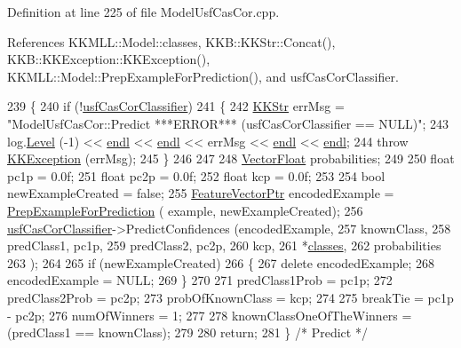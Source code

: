 Definition at line 225 of file Model\+Usf\+Cas\+Cor.\+cpp.



References K\+K\+M\+L\+L\+::\+Model\+::classes, K\+K\+B\+::\+K\+K\+Str\+::\+Concat(), K\+K\+B\+::\+K\+K\+Exception\+::\+K\+K\+Exception(), K\+K\+M\+L\+L\+::\+Model\+::\+Prep\+Example\+For\+Prediction(), and usf\+Cas\+Cor\+Classifier.


\begin{DoxyCode}
239 \{
240   \textcolor{keywordflow}{if}  (!\hyperlink{class_k_k_m_l_l_1_1_model_usf_cas_cor_a7aeb7274e64e73ccfeea3a9da6633d60}{usfCasCorClassifier})
241   \{
242     \hyperlink{class_k_k_b_1_1_k_k_str}{KKStr} errMsg = \textcolor{stringliteral}{"ModelUsfCasCor::Predict   ***ERROR***      (usfCasCorClassifier == NULL)"};
243     log.\hyperlink{class_k_k_b_1_1_run_log_a32cf761d7f2e747465fd80533fdbb659}{Level} (-1) << \hyperlink{namespace_k_k_b_ad1f50f65af6adc8fa9e6f62d007818a8}{endl} << \hyperlink{namespace_k_k_b_ad1f50f65af6adc8fa9e6f62d007818a8}{endl} << errMsg << \hyperlink{namespace_k_k_b_ad1f50f65af6adc8fa9e6f62d007818a8}{endl} << \hyperlink{namespace_k_k_b_ad1f50f65af6adc8fa9e6f62d007818a8}{endl};
244     \textcolor{keywordflow}{throw} \hyperlink{class_k_k_b_1_1_k_k_exception}{KKException} (errMsg);
245   \}
246 
247 
248   \hyperlink{namespace_k_k_b_a4820c3670ee1fe74f0c4de981c600faf}{VectorFloat}  probabilities;
249 
250   \textcolor{keywordtype}{float}  pc1p = 0.0f;
251   \textcolor{keywordtype}{float}  pc2p = 0.0f;
252   \textcolor{keywordtype}{float}  kcp = 0.0f;
253 
254   \textcolor{keywordtype}{bool}  newExampleCreated = \textcolor{keyword}{false};
255   \hyperlink{class_k_k_m_l_l_1_1_feature_vector}{FeatureVectorPtr}  encodedExample = \hyperlink{class_k_k_m_l_l_1_1_model_a31b972adfb64769b3ae966debec824fd}{PrepExampleForPrediction} (
      example, newExampleCreated);
256   \hyperlink{class_k_k_m_l_l_1_1_model_usf_cas_cor_a7aeb7274e64e73ccfeea3a9da6633d60}{usfCasCorClassifier}->PredictConfidences (encodedExample,
257                                            knownClass,
258                                            predClass1, pc1p, 
259                                            predClass2, pc2p,
260                                            kcp,
261                                            *\hyperlink{class_k_k_m_l_l_1_1_model_a764e7680f07814c3c5313dc4e4de60a1}{classes},
262                                            probabilities
263                                           );
264 
265   \textcolor{keywordflow}{if}  (newExampleCreated)
266   \{
267     \textcolor{keyword}{delete} encodedExample;
268     encodedExample = NULL;
269   \}
270 
271   predClass1Prob   = pc1p;
272   predClass2Prob   = pc2p;
273   probOfKnownClass = kcp;
274 
275   breakTie = pc1p - pc2p;
276   numOfWinners = 1;
277 
278   knownClassOneOfTheWinners = (predClass1 == knownClass);
279 
280   \textcolor{keywordflow}{return};
281 \}  \textcolor{comment}{/* Predict */}
\end{DoxyCode}
